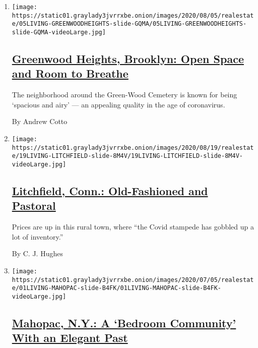 \begin{enumerate}
\def\labelenumi{\arabic{enumi}.}
\item
  \texttt{[image: https://static01.graylady3jvrrxbe.onion/images/2020/08/05/realestate/05LIVING-GREENWOODHEIGHTS-slide-GQMA/05LIVING-GREENWOODHEIGHTS-slide-GQMA-videoLarge.jpg]}

  \hypertarget{greenwood-heights-brooklyn-open-space-and-room-to-breathe}{%
  \subsection{\texorpdfstring{\href{/2020/08/05/realestate/greenwood-heights-brooklyn.html}{Greenwood
  Heights, Brooklyn: Open Space and Room to
  Breathe}}{Greenwood Heights, Brooklyn: Open Space and Room to Breathe}}\label{greenwood-heights-brooklyn-open-space-and-room-to-breathe}}

  The neighborhood around the Green-Wood Cemetery is known for being
  `spacious and airy' --- an appealing quality in the age of
  coronavirus.

  By Andrew Cotto
\item
  \texttt{[image: https://static01.graylady3jvrrxbe.onion/images/2020/08/19/realestate/19LIVING-LITCHFIELD-slide-8M4V/19LIVING-LITCHFIELD-slide-8M4V-videoLarge.jpg]}

  \hypertarget{litchfield-conn-old-fashioned-and-pastoral}{%
  \subsection{\texorpdfstring{\href{/2020/08/19/realestate/litchfield-connecticut.html}{Litchfield,
  Conn.: Old-Fashioned and
  Pastoral}}{Litchfield, Conn.: Old-Fashioned and Pastoral}}\label{litchfield-conn-old-fashioned-and-pastoral}}

  Prices are up in this rural town, where ``the Covid stampede has
  gobbled up a lot of inventory.''

  By C. J. Hughes
\item
  \texttt{[image: https://static01.graylady3jvrrxbe.onion/images/2020/07/05/realestate/01LIVING-MAHOPAC-slide-B4FK/01LIVING-MAHOPAC-slide-B4FK-videoLarge.jpg]}

  \hypertarget{mahopac-ny-a-bedroom-community-with-an-elegant-past}{%
  \subsection{\texorpdfstring{\href{/2020/07/01/realestate/mahopac-ny-a-bedroom-community-with-an-elegant-past.html}{Mahopac,
  N.Y.: A `Bedroom Community' With an Elegant
  Past}}{Mahopac, N.Y.: A `Bedroom Community' With an Elegant Past}}\label{mahopac-ny-a-bedroom-community-with-an-elegant-past}}


\end{enumerate}
